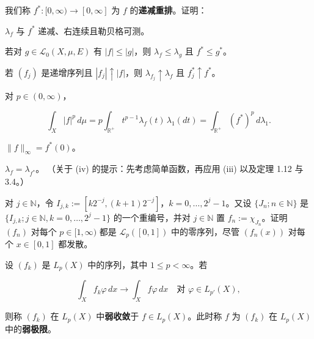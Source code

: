 \begin{exercises}
我们称 $ f^*: [0,\infty) \to [0,\infty] $ 为 $ f $ 的\textbf{递减重排}。证明：

\begin{subitems}
\item

$ \lambda_f $ 与 $ f^* $ 递减、右连续且勒贝格可测。

\item

若对 $ g \in \mathcal{L}_0(X,\mu,E) $ 有 $ |f| \le |g| $，则 $ \lambda_f \le \lambda_g $ 且 $ f^* \le g^* $。

\item

若 $ (f_j) $ 是递增序列且 $ |f_j| \uparrow |f| $，则 $ \lambda_{f_j} \uparrow \lambda_f $ 且 $ f_j^* \uparrow f^* $。

\item

对 $ p \in (0,\infty) $，

\[
\int_X |f|^p \, d\mu = p \int_{\mathbb{R}^+} t^{p-1} \lambda_f(t) \, \lambda_1(dt) = \int_{\mathbb{R}^+} (f^*)^p \, d\lambda_1 .
\]
\item

$ \|f\|_\infty = f^*(0) $。

\item

$ \lambda_f = \lambda_{f^*} $。
（关于 (iv) 的提示：先考虑简单函数，再应用 (iii) 以及定理 1.12 与 3.4。）

\end{subitems}

\item

对 $ j \in \mathbb{N} $，令 $ I_{j,k} := [k2^{-j},(k+1)2^{-j}] $，$ k = 0,\dots,2^j-1 $。又设 $ \{ J_n ; n \in \mathbb{N} \} $ 是 $ \{ I_{j,k} ; j \in \mathbb{N}, k = 0,\dots,2^j-1 \} $ 的一个重编号，并对 $ j \in \mathbb{N} $ 置 $ f_n := \chi_{J_n} $。证明 $ (f_n) $ 对每个 $ p \in [1,\infty) $ 都是 $ \mathcal{L}_p([0,1]) $ 中的零序列，尽管 $ (f_n(x)) $ 对每个 $ x \in [0,1] $ 都发散。

\item

设 $ (f_k) $ 是 $ L_p(X) $ 中的序列，其中 $ 1 \le p < \infty $。若

\[
\int_X f_k\varphi \, dx \to \int_X f\varphi \, dx \quad \text{对 } \varphi \in L_{p'}(X) ,
\]

则称 $ (f_k) $ 在 $ L_p(X) $ 中\textbf{弱收敛}于 $ f \in L_p(X) $。此时称 $ f $ 为 $ (f_k) $ 在 $ L_p(X) $ 中的\textbf{弱极限}。


\end{exercises}
